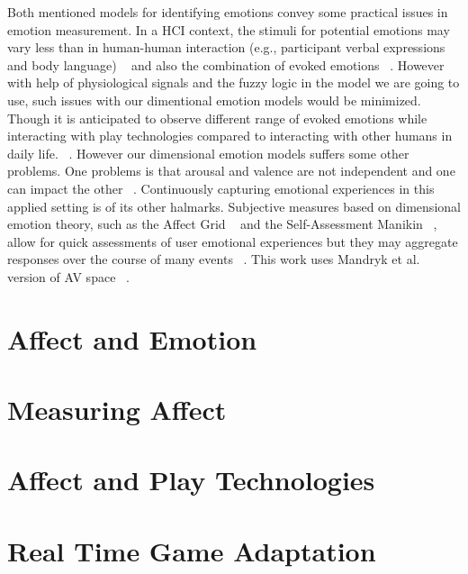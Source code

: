 Both mentioned models for identifying emotions convey some
practical issues in emotion measurement. In a HCI context, the 
stimuli for potential emotions may vary less than
in human-human interaction (e.g., participant verbal expressions and body language) 
~\cite{zhang2010service} and also the combination of
evoked emotions ~\cite{peter2006emotion}. However with help of physiological
signals and the fuzzy logic in the model we are going to
use, such issues with our dimentional emotion models would
be minimized. Though it is anticipated to observe different range 
of evoked emotions while interacting with play
technologies compared to interacting with other humans in
daily life. ~\cite{zhang2010service}. However our dimensional emotion models
suffers some other problems. One problems is that arousal
and valence are not independent and one can impact the
other ~\cite{mandryk2007fuzzy}. Continuously capturing emotional experiences
in this applied setting is of its other halmarks. Subjective
measures based on dimensional emotion theory, such as the
Affect Grid ~\cite{russell1989affect} and the Self-Assessment 
Manikin ~\cite{bradley1994measuring}, allow
for quick assessments of user emotional experiences but they
may aggregate responses over the course of many events ~\cite{zhang2010service}.
This work uses Mandryk et al. version of AV space ~\cite{mandryk2007fuzzy}.


\section{Affect and Emotion}
\section{Measuring Affect}
\section{Affect and Play Technologies}
\section{Real Time Game Adaptation}

